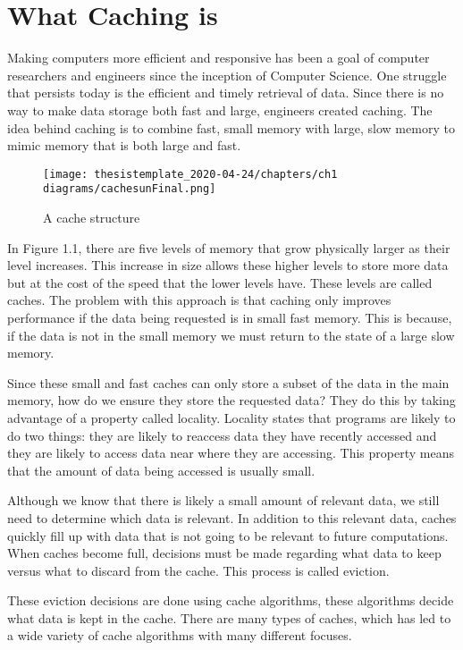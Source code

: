 \section{What Caching is}



Making computers more efficient and responsive has been a goal of computer researchers and engineers since the inception of Computer Science. One struggle that persists today is the efficient and timely retrieval of data. Since there is no way to make data storage both fast and large, engineers created caching. The idea behind caching is to combine fast, small memory with large, slow memory to mimic memory that is both large and fast.

\begin{figure}[h]
    \centering
    \texttt{[image: thesistemplate\_2020-04-24/chapters/ch1 diagrams/cachesunFinal.png]}
    \caption{A cache structure}
    \label{fig:my_label}
\end{figure}

In Figure 1.1, there are five levels of memory that grow physically larger as their level increases. This increase in size allows these higher levels to store more data but at the cost of the speed that the lower levels have. These levels are called caches. The problem with this approach is that caching only improves performance if the data being requested is in small fast memory. This is because, if the data is not in the small memory we must return to the state of a large slow memory.  


Since these small and fast caches can only store a subset of the data in the main memory, how do we ensure they store the requested data? They do this by taking advantage of a property called locality. Locality states that programs are likely to do two things: they are likely to reaccess data they have recently accessed and they are likely to access data near where they are accessing. This property means that the amount of data being accessed is usually small. 

Although we know that there is likely a small amount of relevant data, we still need to determine which data is relevant. In addition to this relevant data, caches quickly fill up with data that is not going to be relevant to future computations. When caches become full, decisions must be made regarding what data to keep versus what to discard from the cache. This process is called eviction.

These eviction decisions are done using cache algorithms, these algorithms decide what data is kept in the cache. There are many types of caches, which has led to a wide variety of cache algorithms with many different focuses.


